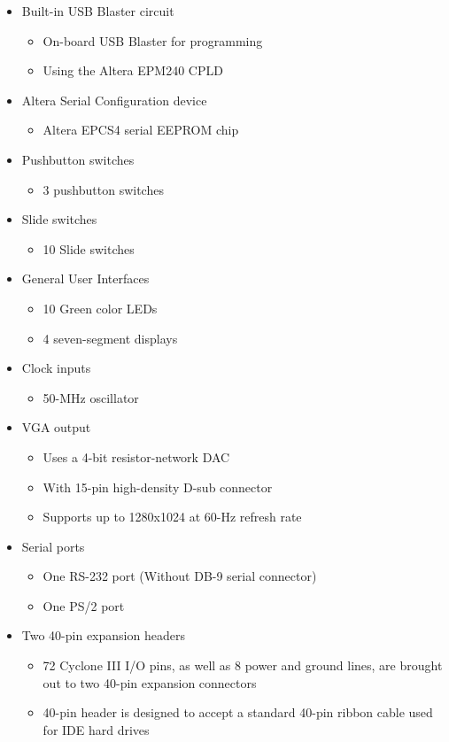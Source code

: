 \documentclass[11pt,peerreview, onecolumn]{IEEEtran}
\begin{document}
\begin{itemize}
\begin{itemize}
	\item Built-in USB Blaster circuit
		\begin{itemize}
	 	\item On-board USB Blaster for programming
		\item Using the Altera EPM240 CPLD
		\end{itemize}
	\item Altera Serial Configuration device
		\begin{itemize}
		\item Altera EPCS4 serial EEPROM chip
		\end{itemize}
	\item Pushbutton switches
		\begin{itemize}
		\item 3 pushbutton switches
		\end{itemize}
	\item Slide switches
		\begin{itemize}
		\item 10 Slide switches
		\end{itemize}
	\item General User Interfaces
		\begin{itemize}
		\item 10 Green color LEDs
		\item 4 seven-segment displays
		\end{itemize}
	\item Clock inputs
		\begin{itemize}
		\item 50-MHz oscillator
		\end{itemize}
	\item VGA output
		\begin{itemize}
		\item Uses a 4-bit resistor-network DAC
		\item With 15-pin high-density D-sub connector
		\item Supports up to 1280x1024 at 60-Hz refresh rate
		\end{itemize}
	\item Serial ports
		\begin{itemize}
		\item One RS-232 port (Without DB-9 serial connector)
		\item One PS/2 port
		\end{itemize}
	\item Two 40-pin expansion headers
		\begin{itemize}
		\item 72 Cyclone III I/O pins, as well as 8 power and ground lines, are brought out to two 40-pin expansion connectors
		\item40-pin header is designed to accept a standard 40-pin ribbon cable used for IDE hard drives
		\end{itemize}
	\end{itemize}
\end{itemize}
\end{document}
